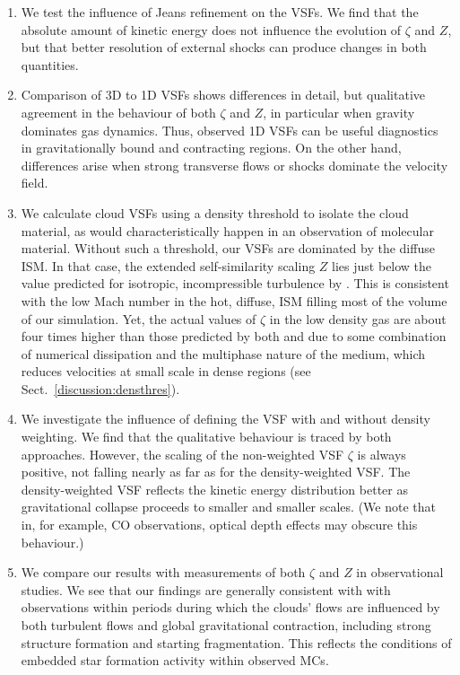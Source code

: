 \documentclass{aa}		%
\begin{document}
\begin{enumerate}
	\item We test the influence of Jeans refinement on the VSFs. We find that the absolute amount of kinetic energy does not influence the evolution of $\zeta$ and $Z$, but that better resolution of external shocks can produce changes in both quantities.
	\item Comparison of 3D to 1D VSFs shows differences in detail, but qualitative agreement in the behaviour of both $\zeta$ and $Z$, in particular when gravity dominates gas dynamics. 
	Thus, observed 1D VSFs can be useful diagnostics in gravitationally bound and contracting regions. 
	On the other hand, differences arise when strong transverse flows or shocks dominate the velocity field. 
	\item We calculate cloud VSFs using a density threshold to isolate the cloud material, as would characteristically happen in an observation of molecular material. 
	Without such a threshold, our VSFs are dominated by the diffuse ISM. In that case, the extended self-similarity scaling $Z$ lies just below the value predicted for isotropic, incompressible turbulence by \citet{She1994}. 
	This is consistent with the low Mach number in the hot, diffuse, ISM filling most of the volume of our simulation.
    Yet, the actual values of $\zeta$ in the low density gas are about four times higher than those predicted by both \citet{She1994} and \citet{Boldyrev2002} due to some combination of numerical dissipation and the multiphase nature of the medium, which reduces velocities at small scale in dense regions (see Sect.~\ref{discussion:densthres}).
	\item We investigate the influence of defining the VSF with and without density weighting. 
	We find that the qualitative behaviour is traced by both approaches. 
	However, the scaling of the non-weighted VSF $\zeta$ is always positive, not falling nearly as far as for the density-weighted VSF. 
	The density-weighted VSF reflects the kinetic energy distribution better as gravitational collapse proceeds to smaller and smaller scales. 
	(We note that in, for example, CO observations, optical depth effects may obscure this behaviour.) 
	\item We compare our results with measurements of both $\zeta$ and $Z$ in observational studies. 
	We see that our findings are generally consistent with with observations within periods during which the clouds' flows are influenced by both turbulent flows and global gravitational contraction, including strong structure formation and starting fragmentation. This reflects the conditions of embedded star formation activity within observed MCs.
\end{enumerate}
\end{document}
